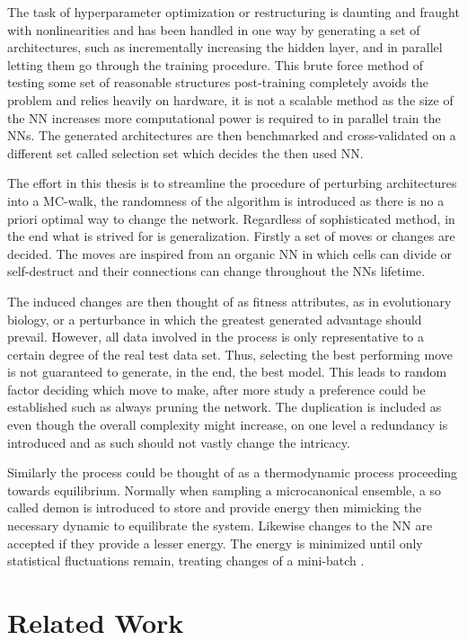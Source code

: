 The task of hyperparameter optimization or restructuring is daunting and fraught with nonlinearities and has been handled in one way by generating a set of architectures, such as incrementally increasing the hidden layer, and in parallel letting them go through the training procedure. This brute force method of testing some set of reasonable structures post-training completely avoids the problem and relies heavily on hardware, it is not a scalable method as the size of the NN increases more computational power is required to in parallel train the NNs. The generated architectures are then benchmarked and cross-validated on a different set called selection set which decides the then used NN. 

The effort in this thesis is to streamline the procedure of perturbing architectures into a MC-walk, the randomness of the algorithm is introduced as there is no a priori optimal way to change the network. Regardless of sophisticated method, in the end what is strived for is generalization. Firstly a set of moves or changes are decided. The moves are inspired from an organic NN in which cells can divide or self-destruct and their connections can change throughout the NNs lifetime. 

The induced changes are then thought of as fitness attributes, as in evolutionary biology, or a perturbance in which the greatest generated advantage should prevail. However, all data involved in the process is only representative to a certain degree of the real test data set. Thus, selecting the best performing move is not guaranteed to generate, in the end, the best model. This leads to random factor deciding which move to make, after more study a preference could be established such as always pruning the network. The duplication is included as even though the overall complexity might increase, on one level a redundancy is introduced and as such should not vastly change the intricacy. 

Similarly the process could be thought of as a thermodynamic process proceeding towards equilibrium. Normally when sampling a microcanonical ensemble, a so called demon is introduced to store and provide energy then mimicking the necessary dynamic to equilibrate the system. Likewise changes to the NN are accepted if they provide a lesser energy. The energy is minimized until only statistical fluctuations remain, treating changes of a mini-batch . 

\section{Related Work}

